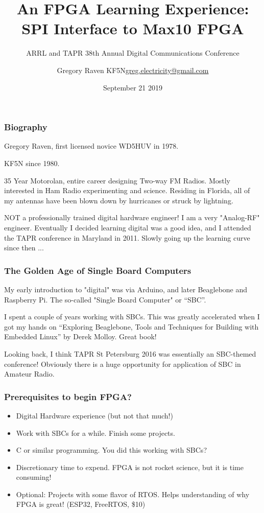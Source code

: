 \documentclass{beamer}
\title{An FPGA Learning Experience: SPI Interface to Max10 FPGA}
\subtitle{ARRL and TAPR 38th Annual Digital Communications Conference}
\author{\texorpdfstring{Gregory Raven KF5N\newline\url{greg.electricity@gmail.com}}{Author}}
\date{September 21 2019}
\begin{document}
	
	\frame{\titlepage}
	
	\begin{frame}
	\frametitle{Biography}
	Gregory Raven, first licensed novice WD5HUV in 1978.
	
	KF5N since 1980.
	
	35 Year Motorolan, entire career designing Two-way FM Radios.
	Mostly interested in Ham Radio experimenting and science.
	Residing in Florida, all of my antennas have been blown down by hurricanes or struck by lightning.
	
	NOT a professionally trained digital hardware engineer!  I am a very "Analog-RF" engineer.
	Eventually I decided learning digital was a good idea, and I attended the TAPR conference in Maryland in 2011.  Slowly going up the learning curve since then ...
\end{frame}

	\begin{frame}
	\frametitle{The Golden Age of Single Board Computers}
	
	My early introduction to "digital" was via Arduino, and later Beaglebone and Raspberry Pi.
	The so-called "Single Board Computer" or ``SBC''.
	
	I spent a couple of years working with SBCs.  This was greatly accelerated when I got my hands on ``Exploring Beaglebone, Tools and Techniques for Building with Embedded Linux'' by Derek Molloy.  Great book!
	
	Looking back, I think TAPR St Petersburg 2016 was essentially an SBC-themed conference!
	Obviously there is a huge opportunity for application of SBC in Amateur Radio.
	
\end{frame}

\begin{frame}
\frametitle{Prerequisites to begin FPGA?}


\begin{itemize}
\item Digital Hardware experience (but not that much!)
\item Work with SBCs for a while.  Finish some projects.
\item C or similar programming.  You did this working with SBCs?
\item Discretionary time to expend.  FPGA is not rocket science, but it is time consuming!
\item Optional:  Projects with some flavor of RTOS.  Helps understanding of why FPGA is great! (ESP32, FreeRTOS, \$10)
\end{itemize}


\end{frame}
\end{document}
